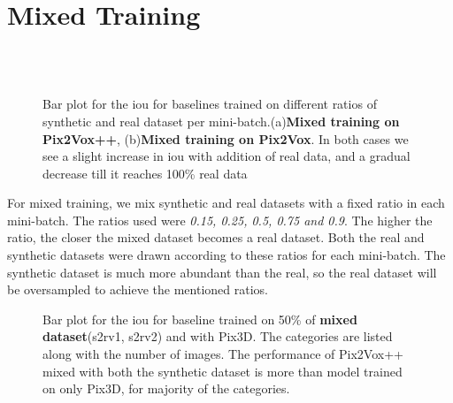 

\section{Mixed Training}\label{sec:mixed-training}

\begin{figure}[!ht]
    \centering
    \subfloat[][]{\resizebox{0.75\linewidth}{!}{}}\\
    \subfloat[][]{\resizebox{0.75\linewidth}{!}{}}\\
    \caption[\gls{iou} Comparison for Mix-Trained Baselines.]{Bar plot for the \gls{iou} for baselines trained on different ratios of synthetic and real dataset per mini-batch.(a)\textbf{Mixed training on Pix2Vox++}, (b)\textbf{Mixed training on Pix2Vox}.
    In both cases we see a slight increase in \gls{iou} with addition of real data, and a gradual decrease till it reaches 100\% real data}
    \label{fig:mixed1}
\end{figure}

For mixed training, we mix synthetic and real datasets with a fixed ratio in each mini-batch.
The ratios used were \emph{0.15, 0.25, 0.5, 0.75 and 0.9}.
The higher the ratio, the closer the mixed dataset becomes a real dataset.
Both the real and synthetic datasets were drawn according to these ratios for each mini-batch.
The synthetic dataset is much more abundant than the real, so the real dataset will be oversampled to achieve the mentioned ratios.


\begin{figure}[!ht]
    \centering
    \resizebox{0.65\textwidth}{!}{}
    \caption[\gls{iou} Comparison for Each Category from Mix-Trained Pix2Vox++.]{Bar plot for the \gls{iou} for baseline  trained on 50\% of \textbf{mixed dataset}(\gls{s2rv1}, \gls{s2rv2}) and with Pix3D.
    The categories are listed along with the number of images.
    The performance of Pix2Vox++ mixed with both the synthetic dataset is more than model trained on only Pix3D, for majority of the categories.
    }
    \label{fig:mixed2}
\end{figure}

